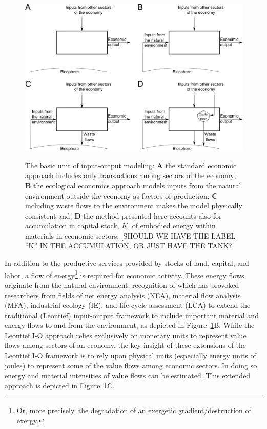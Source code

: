 \begin{figure}[!ht]
\centering\
\includegraphics[width=\linewidth]{Part_0/Chapter_Introduction/images/Basic_unit_square.pdf}
\caption[The basic unit of input-output modeling]{The basic unit 
of input-output modeling: 
\textbf{A} the standard economic approach includes only transactions 
among sectors of the economy; 
\textbf{B} the ecological economics approach models inputs 
from the natural environment outside the economy as factors of production; 
\textbf{C} including waste flows to the environment makes the model physically consistent and;
\textbf{D} the method presented here accounts also for accumulation
in capital stock, $K$, of embodied energy within materials in economic sectors. 
[SHOULD WE HAVE THE LABEL ``K'' IN THE ACCUMULATION, OR JUST HAVE THE TANK?]}
\label{fig:basic_unit}
\end{figure}

In addition to the productive services provided by stocks of land, capital, and labor,
a flow of energy\footnote{Or, more precisely, 
the degradation of an exergetic gradient/destruction of exergy.} 
is required for economic activity. 
These energy flows originate from the natural environment, 
recognition of which has provoked researchers from fields of 
net energy analysis (NEA), 
material flow analysis (MFA), 
industrial ecology (IE), and 
life-cycle assessment (LCA) 
to extend the traditional (Leontief) input-output framework 
to include important material and energy flows to and from the environment, 
as depicted in Figure~\ref{fig:basic_unit}B.\cite{Carter1974,Bullard1975,Bullard1976a,Herendeen1978,Costanza:1980ww,Casler1984,Joshi:1999uw,Suh2009}
While the Leontief I-O approach relies exclusively 
on monetary units to represent value flows 
among sectors of an economy, 
the key insight of these extensions 
of the Leontief I-O framework is to rely upon physical units 
(especially energy units of joules) 
to represent some of the value flows among economic sectors. 
In doing so, energy and material intensities of value flows can be estimated. 
This extended approach is depicted in Figure~\ref{fig:basic_unit}C. 

